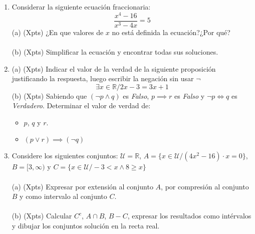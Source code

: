 \documentclass[a4paper]{article}
\begin{document}
\begin{enumerate}
        (b) (Xpts) Calcular \textbf{todas} las raíces de la ecuación $x^4 +8x^2 +16=0$.\\\\
        (c) (Xpts) Considerar la ecuación $ax^2+5x+c$. Determinar los valores de $a$ y $c$ sabiendo que la suma de sus raíces es $-5$ y el producto de sus raíces es $6$.
        \item Considerar la siguiente ecuación fraccionaria:
        \begin{equation*}
                \frac{x^4-16}{x^3-4x}=5
        \end{equation*}
        (a) (Xpts) ¿En que valores de $x$ no está definida la ecuación?¿Por qué?\\\\
        (b) (Xpts) Simplificar la ecuación y encontrar todas sus soluciones.
        \item (a) (Xpts) Indicar el valor de la verdad de la siguiente proposición justificando la respuesta, luego escribir la negación sin usar $\neg$ 
        \begin{equation*}
                \exists x \in \mathbb{R} / 2x-3=3x+1
        \end{equation*}
        (b) (Xpts) Sabiendo que $(\neg p \wedge q)$ es \textit{Falso}, $p \implies r$ es \textit{Falso} y $\neg p \iff q$ es \textit{Verdadero}. Determinar el valor de verdad de:
        \begin{itemize}
                \item $p$, $q$ y $r$.
                \item $(p \vee r) \implies (\neg q)$
        \end{itemize}
        \item Considere los siguientes conjuntos: $\mathcal{U}=\mathbb{R}$, $A=\{x \in \mathcal{U}/(4x^2-16)\cdot x=0\}$, $B=[3, \infty)$ y $C=\{x\in \mathcal{U}/-3< x \wedge 8\geq x\}$\\\\
        (a) (Xpts) Expresar por extensión al conjunto $A$, por compresión al conjunto $B$ y como intervalo al conjunto $C$.\\\\
        (b) (Xpts) Calcular $C^c$, $A \cap B$, $B-C$, expresar los resultados como intérvalos y dibujar los conjuntos solución en la recta real.
\end{enumerate}
\end{document}
